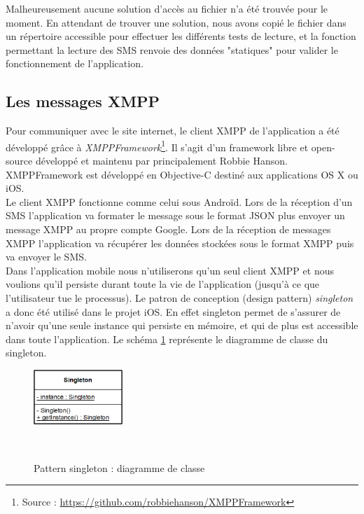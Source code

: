 Malheureusement aucune solution d'accès au fichier n'a été trouvée pour le moment.
En attendant de trouver une solution, nous avons copié le fichier dans un répertoire accessible pour effectuer les différents tests de lecture, et la fonction permettant la lecture des SMS renvoie des données "statiques" pour valider le fonctionnement de l'application.
\\




\subsection{Les messages XMPP}

Pour communiquer avec le site internet, le client XMPP de l'application a été développé grâce à \textit{XMPPFramework}\footnote{Source : \href{https://github.com/robbiehanson/XMPPFramework}{https://github.com/robbiehanson/XMPPFramework}}.
Il s'agit d'un framework libre et open-source développé et maintenu par principalement Robbie Hanson.
XMPPFramework est développé en Objective-C destiné aux applications OS X ou iOS.
\\


Le client XMPP fonctionne comme celui sous Androïd.
Lors de la réception d'un SMS l'application va formater le message sous le format JSON plus envoyer un message XMPP au propre compte Google.
Lors de la réception de messages XMPP l'application va récupérer les données stockées sous le format XMPP puis va envoyer le SMS.
\\


Dans l'application mobile nous n'utiliserons qu'un seul client XMPP et nous voulions qu'il persiste durant toute la vie de l'application (jusqu'à ce que l'utilisateur tue le processus).
Le patron de conception (design pattern) \textit{singleton} a donc été utilisé dans le projet iOS.
En effet singleton permet de s'assurer de n'avoir qu'une seule instance qui persiste en mémoire, et qui de plus est accessible dans toute l'application.
Le schéma \ref{pattern_singleton} représente le diagramme de classe du singleton.
\begin{figure}[!h]
	\center
	\includegraphics[width=0.3\textwidth]{img/pattern_singleton.png}
	\caption{Pattern singleton : diagramme de classe}
	\label{pattern_singleton}
~~\\
\end{figure}

